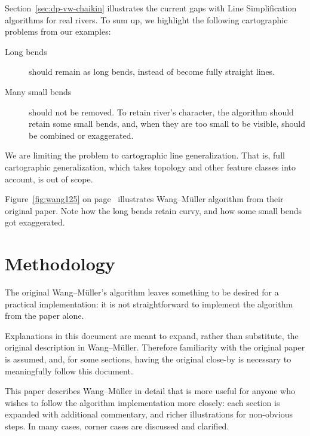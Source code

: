 \documentclass[a4paper]{article}
\newcommand{\onpage}[1]{\ref{#1} on page~\pageref{#1}}
\newcommand{\WM}{Wang--M{\"u}ller}
\begin{document}
Section~\ref{sec:dp-vw-chaikin} illustrates the current gaps with Line
Simplification algorithms for real rivers. To sum up, we highlight the
following cartographic problems from our examples:

\begin{description}

    \item[Long bends] should remain as long bends, instead of become fully
        straight lines.

    \item[Many small bends] should not be removed. To retain river's character,
        the algorithm should retain some small bends, and, when they are too
        small to be visible, should be combined or exaggerated.

\end{description}

We are limiting the problem to cartographic line generalization. That is, full
cartographic generalization, which takes topology and other feature classes
into account, is out of scope.

Figure~\onpage{fig:wang125} illustrates {\WM} algorithm from their original
paper. Note how the long bends retain curvy, and how some small bends got
exaggerated.

\section{Methodology}
\label{sec:methodology}
% 

The original {\WM}'s algorithm \cite{wang1998line} leaves something to be
desired for a practical implementation: it is not straightforward to implement
the algorithm from the paper alone.

Explanations in this document are meant to expand, rather than substitute, the
original description in {\WM}. Therefore familiarity with the original paper is
assumed, and, for some sections, having the original close-by is necessary to
meaningfully follow this document.

This paper describes {\WM} in detail that is more useful for anyone who wishes
to follow the algorithm implementation more closely: each section is expanded
with additional commentary, and richer illustrations for non-obvious steps. In
many cases, corner cases are discussed and clarified.
\end{document}
